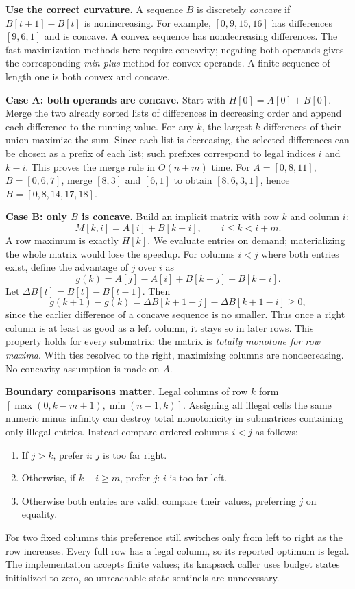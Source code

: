 \textbf{Use the correct curvature.} A sequence $B$ is discretely
\emph{concave} if $B[t+1]-B[t]$ is nonincreasing. For example,
$[0,9,15,16]$ has differences $[9,6,1]$ and is concave.
A convex sequence has nondecreasing differences.
The fast maximization methods here require concavity; negating both
operands gives the corresponding \emph{min-plus} method for convex
operands. A finite sequence of length one is both convex and concave.

\textbf{Case A: both operands are concave.} Start with
$H[0]=A[0]+B[0]$. Merge the two already sorted lists of differences
in decreasing order and append each difference to the running value.
For any $k$, the largest $k$ differences of their union maximize the
sum. Since each list is decreasing, the selected differences can be
chosen as a prefix of each list; such prefixes correspond to legal
indices $i$ and $k-i$. This proves the merge rule in $O(n+m)$ time.
For $A=[0,8,11]$, $B=[0,6,7]$, merge $[8,3]$ and $[6,1]$ to obtain
$[8,6,3,1]$, hence $H=[0,8,14,17,18]$.

\textbf{Case B: only $B$ is concave.} Build an implicit matrix with
row $k$ and column $i$:
\[
 M[k,i]=A[i]+B[k-i],\qquad i\le k<i+m.
\]
A row maximum is exactly $H[k]$. We evaluate entries on demand;
materializing the whole matrix would lose the speedup.
For columns $i<j$ where both entries exist, define the advantage of
$j$ over $i$ as
\[
 g(k)=A[j]-A[i]+B[k-j]-B[k-i].
\]
Let $\Delta B[t]=B[t]-B[t-1]$. Then
\[
 g(k+1)-g(k)=\Delta B[k+1-j]-\Delta B[k+1-i]\ge0,
\]
since the earlier difference of a concave sequence is no smaller.
Thus once a right column is at least as good as a left column,
it stays so in later rows. This property holds for every submatrix:
the matrix is \emph{totally monotone for row maxima}. With ties
resolved to the right, maximizing columns are nondecreasing.
No concavity assumption is made on $A$.

\textbf{Boundary comparisons matter.} Legal columns of row $k$ form
$[\max(0,k-m+1),\min(n-1,k)]$. Assigning all illegal cells the same
numeric minus infinity can destroy total monotonicity in submatrices
containing only illegal entries. Instead compare ordered columns
$i<j$ as follows:
\begin{enumerate}
\item If $j>k$, prefer $i$: $j$ is too far right.
\item Otherwise, if $k-i\ge m$, prefer $j$: $i$ is too far left.
\item Otherwise both entries are valid; compare their values,
preferring $j$ on equality.
\end{enumerate}
For two fixed columns this preference still switches only from left
to right as the row increases. Every full row has a legal column,
so its reported optimum is legal. The implementation accepts finite
values; its knapsack caller uses budget states initialized to zero,
so unreachable-state sentinels are unnecessary.

